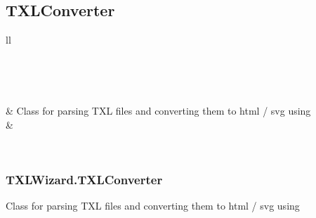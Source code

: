 \documentclass[letterpaper,10pt,english]{sphinxmanual}
\begin{document}
\subsection{TXLConverter}
\label{Chapters/40_PythonModuleReference:txlconverter}
\begin{longtable}{ll}
\hline
\endfirsthead

%
{{}} \\
\hline
\endhead

\hline {} \\ \hline
\endfoot

\endlastfoot


{\hyperref[Chapters/PythonModuleReference/TXLConverter/TXLWizard.TXLConverter:module\string-TXLWizard.TXLConverter]{}}
 & 
Class for parsing TXL files and converting them to html / svg using {\hyperref[Chapters/PythonModuleReference/TXLWriter/TXLWizard.TXLWriter:module\string-TXLWizard.TXLWriter]{}}
\\
\hline
{}
 & 

\\
\hline\end{longtable}



\subsubsection{TXLWizard.TXLConverter}
\label{Chapters/PythonModuleReference/TXLConverter/TXLWizard.TXLConverter:txlwizard-txlconverter}\label{Chapters/PythonModuleReference/TXLConverter/TXLWizard.TXLConverter::doc}\label{Chapters/PythonModuleReference/TXLConverter/TXLWizard.TXLConverter:module-TXLWizard.TXLConverter}
Class for parsing TXL files and converting them to html / svg using {\hyperref[Chapters/PythonModuleReference/TXLWriter/TXLWizard.TXLWriter:module\string-TXLWizard.TXLWriter]{}}
\end{document}
